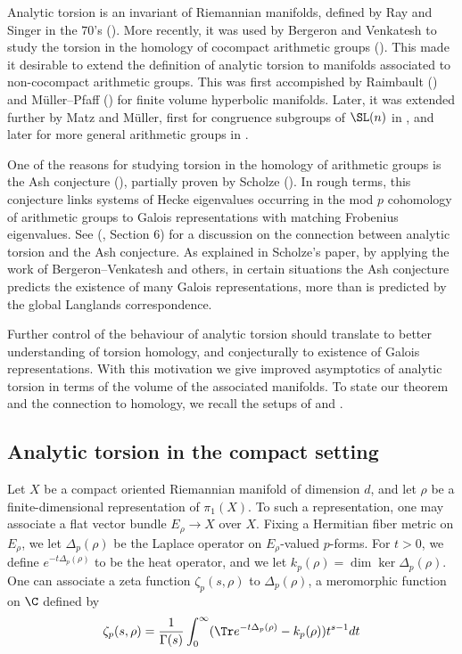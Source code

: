 \noindent Analytic torsion is an invariant of Riemannian manifolds, defined by Ray and Singer in the $70$'s (\cite{RS}). More recently, it was used by Bergeron and Venkatesh to study the torsion in the homology of cocompact arithmetic groups (\cite{BV}). This made it desirable to extend the definition of analytic torsion to manifolds associated to non-cocompact arithmetic groups. This was first accompished by Raimbault (\cite{Raimbault}) and Müller--Pfaff (\cite{MP}) for finite volume hyperbolic manifolds. Later, it was extended further by Matz and Müller, first for congruence subgroups of $\SL(n)$ in \cite{MzM1}, and later for more general arithmetic groups in \cite{MzM3}. 

One of the reasons for studying torsion in the homology of arithmetic groups is the Ash conjecture (\cite{Ash}), partially proven by Scholze (\cite{Scholze}). In rough terms, this conjecture links systems of Hecke eigenvalues occurring in the mod $p$ cohomology of arithmetic groups to Galois representations with matching Frobenius eigenvalues. See (\cite{BV}, Section $6$) for a discussion on the connection between analytic torsion and the Ash conjecture. As explained in Scholze's paper, by applying the work of Bergeron--Venkatesh and others, in certain situations the Ash conjecture predicts the existence of many Galois representations, more than is predicted by the global Langlands correspondence. 

Further control of the behaviour of analytic torsion should translate to better understanding of torsion homology, and conjecturally to existence of Galois representations. With this motivation we give improved asymptotics of analytic torsion in terms of the volume of the associated manifolds. To state our theorem and the connection to homology, we recall the setups of \cite{BV} and \cite{MzM2}.

\subsection{Analytic torsion in the compact setting}

Let $X$ be a compact oriented Riemannian manifold of dimension $d$, and let $\rho$ be a finite-dimensional representation of $\pi_1(X)$. To such a representation, one may associate a flat vector bundle $E_\rho\to X$ over $X$. Fixing a Hermitian fiber metric on $E_\rho$, we let $\Delta_p(\rho)$ be the Laplace operator on $E_\rho$-valued $p$-forms. For $t>0$, we define $e^{-t\Delta_p(\rho)}$ to be the heat operator, and we let $k_p(\rho) =\dim\ker \Delta_p(\rho)$. One can associate a zeta function $\zeta_p(s,\rho)$ to $\Delta_p(\rho)$, a meromorphic function on $\C$ defined by
\begin{align}\label{zeta}
    \zeta_p(s,\rho) = \frac{1}{\Gamma(s)}\int_0^\infty (\Tr e^{-t\Delta_p(\rho)}-k_p(\rho))t^{s-1} dt
\end{align}


